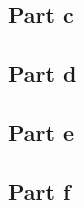 \documentclass[paper=a4, fontsize=11pt]{scrartcl} %
\numberwithin{equation}{section} %
\numberwithin{figure}{section} %
\numberwithin{table}{section} %
\begin{document}
	\subsection{Part c}
	
	\subsection{Part d}
	
	\subsection{Part e}
	
	\subsection{Part f}
	
\end{document}
